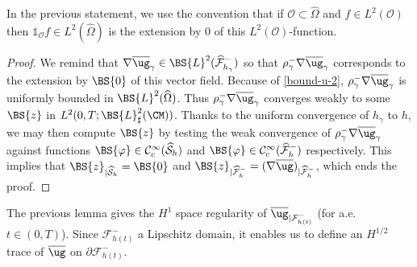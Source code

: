 \begin{remark}
In the previous statement, we use the convention that if $\mathcal O \subset \widehat{\Omega}$ and $f \in L^2(\mathcal O)$ then $\mathds{1}_{\mathcal O} f \in L^2(\widehat{\Omega})$ is the extension by $0$ of this $L^2(\mathcal O)$-function.
\end{remark}
\begin{proof}
We remind that $\nabla \overline{\ug}_{\gamma} \in \BS{L}^2(\widehat{\mathcal F}^{-}_{h_{\gamma}})$ so that $\rho_\gamma^-\nabla \overline{\ug}_{\gamma}$ corresponds to the extension by $\BS{0}$ of this vector field. Because of \eqref{bound-u-2}, $\rho_\gamma^-\nabla \overline{\ug}_{\gamma}$ is uniformly bounded in $\BS{L}^{2}(\widehat{\Omega})$. Thus $\rho^-_\gamma \nabla \overline{\ug}_{\gamma}$ converges weakly to some $\BS{z}$ in $L^{2}(0,T;\BS{L}_\sharp^{2}(\CM))$. Thanks to the uniform convergence of $h_{\gamma}$ to $h$, we may then compute $\BS{z}$ by testing
the weak convergence of $\rho^-_\gamma \nabla \overline{\ug}_{\gamma}$ against
functions $\BS{\varphi} \in \mathcal C^{\infty}_c(\widehat{\mathcal S}_h)$ and
$\BS{\varphi} \in \mathcal C^{\infty}_c(\widehat{\mathcal F}_h^{-})$ respectively. This implies that $\BS{z}_{\vert\widehat{\mathcal{S}}_h}=\BS{0}$ and
$\BS{z}_{\vert\widehat{\mathcal{F}}^-_{h}}=(\nabla \overline{\ug})_{\vert\widehat{\mathcal{F}}^-_{h}}$, which ends the proof.
\end{proof}

\begin{remark}
The previous lemma gives the $H^1$ space regularity of $\overline{\ug}_{|{\mathcal{F}^-_{h(t)}}}$ (for a.e. $t \in (0,T)$). Since $\mathcal{F}^-_{h(t)}$ a Lipschitz domain, it enables us to define an $H^{1/2}$ trace of $\overline{\ug}$ on ${\partial \mathcal F^-_{h(t)}}$.
\end{remark}

